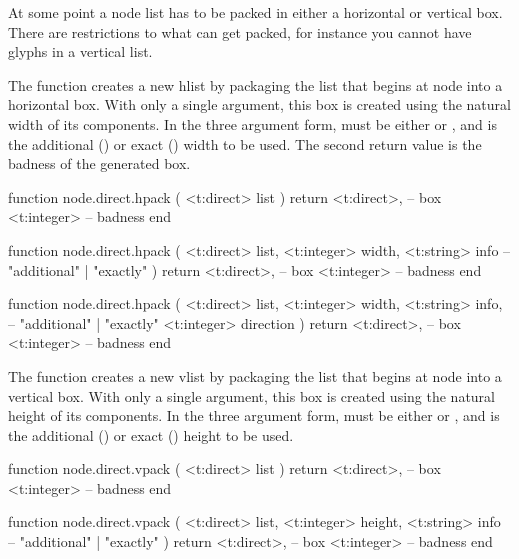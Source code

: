 At some point a node list has to be packed in either a horizontal or vertical
box. There are restrictions to what can get packed, for instance you cannot have
glyphs in a vertical list.


The  function creates a new hlist by packaging the list that begins
at node  into a horizontal box. With only a single argument, this box is
created using the natural width of its components. In the three argument form,
 must be either  or , and 
is the additional () or exact () width to be
used. The second return value is the badness of the generated box.

\starttyping[option=LUA]
function node.direct.hpack (
    <t:direct> list
)
    return
        <t:direct>, -- box
        <t:integer> -- badness
end

function node.direct.hpack (
    <t:direct>  list,
    <t:integer> width,
    <t:string>  info -- "additional" | "exactly"
)
    return
        <t:direct>, -- box
        <t:integer> -- badness
end

function node.direct.hpack (
    <t:direct>  list,
    <t:integer> width,
    <t:string>  info, -- "additional" | "exactly"
    <t:integer> direction
)
    return
        <t:direct>, -- box
        <t:integer> -- badness
end
\stoptyping


The  function creates a new vlist by packaging the list that begins
at node  into a vertical box. With only a single argument, this box is
created using the natural height of its components. In the three argument form,
 must be either  or , and 
is the additional () or exact () height to be
used.

\starttyping[option=LUA]
function node.direct.vpack (
    <t:direct> list
)
    return
        <t:direct>, -- box
        <t:integer> -- badness
end

function node.direct.vpack (
    <t:direct>  list,
    <t:integer> height,
    <t:string>  info -- "additional" | "exactly"
)
    return
        <t:direct>, -- box
        <t:integer> -- badness
end

